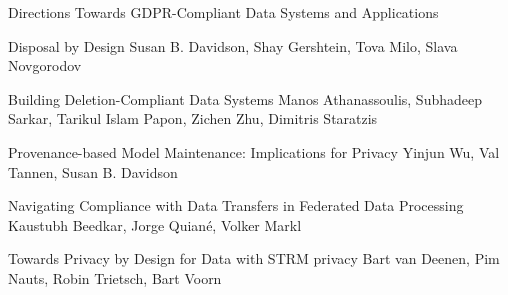 \documentclass[11pt]{article}
\begin{document}
\begin{bulletin}
\begin{articlesection}{Directions Towards GDPR-Compliant Data Systems and Applications}
%
%


\begin{article}
{Disposal by Design}
{Susan B. Davidson, Shay Gershtein, Tova Milo, Slava Novgorodov}
\graphicspath{{submissions/disposal-by-design/}}

\end{article}

\begin{article}
{Building Deletion-Compliant Data Systems}
{Manos Athanassoulis, Subhadeep Sarkar, Tarikul Islam Papon, Zichen Zhu, Dimitris Staratzis}
\graphicspath{{submissions/building-deletion-compliant-data-systems/}}

\end{article}

\begin{article}
{Provenance-based Model Maintenance: Implications for Privacy}
{Yinjun Wu, Val Tannen, Susan B. Davidson}
\graphicspath{{submissions/provenance-based-model-maintenance-implications-for-privacy/}}

\end{article}

\begin{article}
{Navigating Compliance with Data Transfers in Federated Data Processing}
{Kaustubh Beedkar, Jorge Quian\'e, Volker Markl}
\graphicspath{{submissions/navigating-compliance-with-data-transfers-in-federated-data-processing/}}

\end{article}

\begin{article}
{Towards Privacy by Design for Data with \MakeUppercase{strm} privacy}
{Bart van Deenen, Pim Nauts, Robin Trietsch, Bart Voorn}
\graphicspath{{submissions/towards-privacy-by-design-for-data-with-strm-privacy/}}

\end{article}









\end{articlesection}
\end{bulletin}
\end{document}
